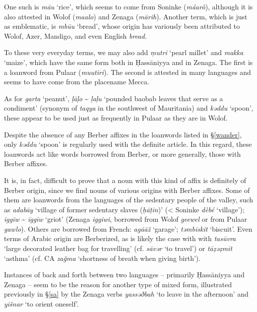 \documentclass[output=paper]{langsci/langscibook}
\begin{document}
One such is \textit{mā{\R}u} ‘rice’, which seems to come from Soninke (\textit{máarò}), although it is also attested in Wolof (\textit{maalo}) and Zenaga (\textit{mārih}). Another term, which is just as emblematic, is \textit{mbū{\R}u} ‘bread’, whose origin has variously been attributed to Wolof, Azer, Mandigo, and even English \textit{bread}.

To these very everyday terms, we may also add \textit{ṃutri} ‘pearl millet’ and \textit{makka} ‘maize’, which have the same form both in Ḥassāniyya and in Zenaga. The first is a loanword from Pulaar (\textit{muutiri}). The second is attested in many languages and seems to have come from the placename Mecca. 

As for \textit{garta} ‘peanut’, \textit{ḷāḷo} \~{} \textit{ḷaḷu} ‘pounded baobab leaves that serve as a condiment’ (synonym of \textit{taqya} in the southwest of Mauritania) and \textit{kəddu} ‘spoon’, these appear to be used just as frequently in Pulaar as they are in Wolof. 


Despite the absence of any Berber affixes in the loanwords listed in §\ref{wander}, only \textit{kəddu} ‘spoon’ is regularly used with the definite article. In this regard, these loanwords act like words borrowed from Berber, or more generally, those with Berber affixes. 

It is, in fact, difficult to prove that a noun with this kind of affix is definitely of Berber origin, since we find nouns of various origins with Berber affixes. Some of them are loanwords from the languages of the sedentary people of the valley, such as \textit{adabāy} ‘village of former sedentary slaves (\textit{ḥ{\R}āṭīn})’ (< Soninke \textit{dèbé} ‘village’); \textit{iggīw} \~{} \textit{īggīw} ‘griot’ (Zenaga \textit{iggiwi}, borrowed from Wolof \textit{geewel} or from Pulaar \textit{gawlo}). Others are borrowed from French: \textit{agā{\R}āž} ‘garage’; \textit{təmbīskit} ‘biscuit’. Even terms of Arabic origin are Berberized, as is likely the case with with \textit{tasūvra} ‘large decorated leather bag for travelling’ (cf. \textit{sāvər} ‘to travel’) or \textit{tāẓəẓmīt} ‘asthma’ (cf. CA \textit{zaǧma} ‘shortness of breath when giving birth’).


Instances of back and forth between two languages – primarily Ḥassāniyya and Zenaga – seem to be the reason for another type of mixed form, illustrated previously in §\ref{sa} by the Zenaga verbs \textit{yassəðbah} ‘to leave in the afternoon’ and \textit{yišnar} ‘to orient oneself’.
\end{document}
